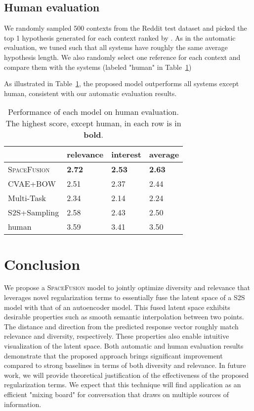 \documentclass[11pt,a4paper]{article}
\begin{document}
\subsection{Human evaluation}
We randomly sampled 500 contexts from the Reddit test dataset and picked the top 1 hypothesis generated for each context ranked by . As in the automatic evaluation, we tuned  such that all systems have roughly the same average hypothesis length. We also randomly select one reference for each context and compare them with the systems (labeled "human" in Table~\ref{table:human})

As illustrated in Table~\ref{table:human}, the proposed model outperforms all systems except human, consistent with our automatic evaluation results. 

\begin{table}[H]
    \centering
    \small
    \begin{tabular}{p{}|p{}p{}p{}} \hline 
    
                     & relevance     & interest        & average \\ \hline
    \textsc{SpaceFusion}          & \textbf{2.72} & \textbf{2.53} & \textbf{2.63} \\ 
    CVAE+BOW         & 2.51         & 2.37          & 2.44 \\
    Multi-Task       & 2.34          & 2.14          & 2.24 \\ 
    S2S+Sampling & 2.58          & 2.43          & 2.50 \\ \hline
    human            & 3.59          & 3.41          & 3.50 \\ \hline
    
    \end{tabular}
    \caption{Performance of each model on human evaluation. The highest score, except human, in each row is in \textbf{bold}.}
    \label{table:human}
\end{table}
 
\section{Conclusion}
We propose  a \textsc{SpaceFusion} model to jointly optimize diversity and relevance that leverages novel regularization terms to essentially fuse the latent space of a S2S model with that of an autoencoder model. This fused latent space exhibits desirable properties such as smooth semantic interpolation between two points. The distance and direction from the predicted response vector roughly match relevance and diversity, respectively. These properties also enable intuitive visualization of the latent space. Both automatic and human evaluation results demonstrate that the proposed approach brings significant improvement compared to strong baselines in terms of both diversity and relevance. 
In future work, we will provide theoretical justification of the effectiveness of the proposed regularization terms. We expect that this technique will find application as an efficient "mixing board" for conversation that draws on multiple sources of information.
 
\clearpage
\newpage


\end{document}
